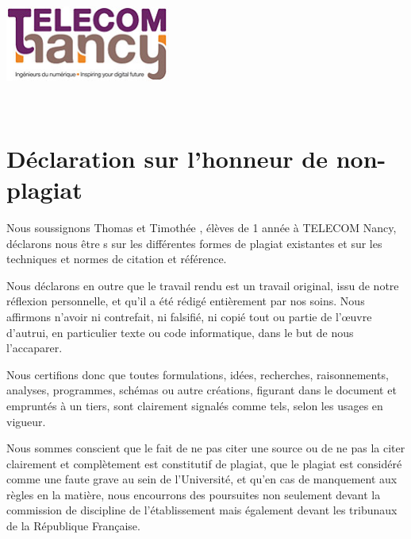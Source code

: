\documentclass[a4paper, 11pt, twoside]{book}
\renewcommand{\tn}{TELECOM Nancy}
\newcommand{\fisa}{\sc{fisa}}
\begin{document}
\begin{titlepage}

\includegraphics[height=2.5cm]{resources/logo_tn.jpg}\\[1cm]

\vfill{}
\end{titlepage}
\clearpage{}


~\vfill
\clearpage{}


\pagestyle{plain}
\section*{Déclaration sur l'honneur de non-plagiat}

Nous soussignons Thomas  et Timothée , élèves de 1 année \fisa{} à \tn{}, déclarons nous être s sur les différentes formes de plagiat existantes et sur les techniques et normes de citation et référence.

Nous déclarons en outre que le travail rendu est un travail original, issu de notre réflexion personnelle, et qu'il a été rédigé entièrement par nos soins. Nous affirmons n'avoir ni contrefait, ni falsifié, ni copié tout ou partie de l'\oe{}uvre d'autrui, en particulier texte ou code informatique, dans le but de nous l'accaparer.

Nous certifions donc que toutes formulations, idées, recherches, raisonnements, analyses, programmes, schémas ou autre créations, figurant dans le document et empruntés à un tiers, sont clairement signalés comme tels, selon les usages en vigueur.

Nous sommes conscient que le fait de ne pas citer une source ou de ne pas la citer clairement et complètement est constitutif de plagiat, que le plagiat est considéré comme une faute grave au sein de l'Université, et qu'en cas de manquement aux règles en la matière, nous encourrons des poursuites non seulement devant la commission de discipline de l'établissement mais également devant les tribunaux de la République Fran\c{c}aise.
\end{document}
